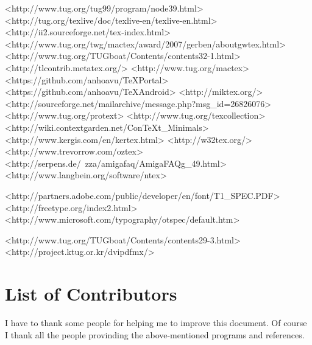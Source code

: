 	<http://www.tug.org/tug99/program/node39.html>
	<http://tug.org/texlive/doc/texlive-en/texlive-en.html>
	<http://ii2.sourceforge.net/tex-index.html>
	<http://www.tug.org/twg/mactex/award/2007/gerben/aboutgwtex.html>
	<http://www.tug.org/TUGboat/Contents/contents32-1.html>
	<http://tlcontrib.metatex.org/>
	<http://www.tug.org/mactex>
	<https://github.com/anhoavu/TeXPortal>
	<https://github.com/anhoavu/TeXAndroid>
	<http://miktex.org/>
	<http://sourceforge.net/mailarchive/message.php?msg_id=26826076>
	<http://www.tug.org/protext>
	<http://www.tug.org/texcollection>
	<http://wiki.contextgarden.net/ConTeXt_Minimals>
	<http://www.kergis.com/en/kertex.html>
	<http://w32tex.org/>
	<http://www.trevorrow.com/oztex>
	<http://serpens.de/~zza/amigafaq/AmigaFAQg_49.html>
	<http://www.langbein.org/software/ntex>

	<http://partners.adobe.com/public/developer/en/font/T1_SPEC.PDF>
	<http://freetype.org/index2.html>
	<http://www.microsoft.com/typography/otspec/default.htm>

	<http://www.tug.org/TUGboat/Contents/contents29-3.html>
	<http://project.ktug.or.kr/dvipdfmx/>

\clearpage
\section{List of Contributors}
I have to thank some people for helping me to improve this document. Of course I thank all the people provinding the above-mentioned programs and references.


